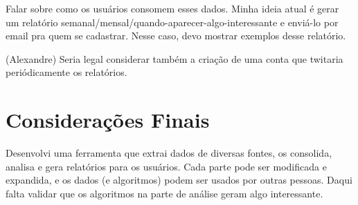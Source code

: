 Falar sobre como os usuários consomem esses dados. Minha ideia atual é gerar um relatório semanal/mensal/quando-aparecer-algo-interessante e enviá-lo por email pra quem se cadastrar. Nesse caso, devo mostrar exemplos desse relatório.


(Alexandre) Seria legal considerar também a criação de uma conta que twitaria periódicamente os relatórios.


\section{Considerações Finais}

Desenvolvi uma ferramenta que extrai dados de diversas fontes, os consolida, analisa e gera relatórios para os usuários. Cada parte pode ser modificada e expandida, e os dados (e algoritmos) podem ser usados por outras pessoas. Daqui falta validar que os algoritmos na parte de análise geram algo interessante.
